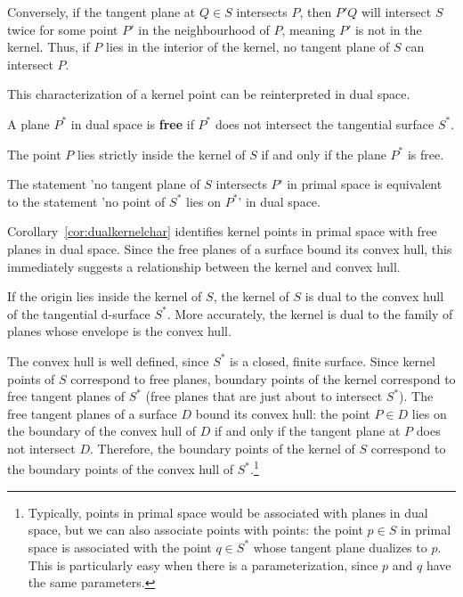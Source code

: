 \documentclass[doublespacing]{elsart}
\begin{document}
Conversely, if the tangent plane at $Q \in S$ intersects $P$, then $P'Q$ will intersect $S$ twice for some point $P'$ in 
the neighbourhood of $P$, meaning $P'$ is not in the kernel.
Thus, if $P$ lies in the interior of the kernel, no tangent plane of $S$ can intersect $P$.
\QED

\noindent This characterization of a kernel point can be reinterpreted in dual space.

\begin{defn2}
A plane $P^*$ in dual space is {\bf free} if $P^*$ does not intersect the tangential surface $S^*$.
\end{defn2}

\begin{corollary}
\label{cor:dualkernelchar}
The point $P$ lies strictly inside the kernel of $S$ if and only if 
the plane $P^*$ is free.
\end{corollary}
\prf
The statement 'no tangent plane of $S$ intersects $P$' in primal space
is equivalent to the statement 'no point of $S^*$ lies on $P^*$' in dual space.
\QED

Corollary~\ref{cor:dualkernelchar} identifies kernel points in primal space
with free planes in dual space.
Since the free planes of a surface bound its convex hull,
this immediately suggests a relationship between the kernel and convex hull.

\begin{theorem}
\label{thm:kernelhull}
If the origin lies inside the kernel of $S$,
the kernel of $S$ is dual to the convex hull of the tangential d-surface $S^*$.
More accurately, the kernel is dual to the family of planes whose
envelope is the convex hull.
\end{theorem}
\prf
The convex hull is well defined, since $S^*$ is a closed, finite surface.
Since kernel points of $S$ correspond to free planes,
boundary points of the kernel correspond to free tangent planes of $S^*$
(free planes that are just about to intersect $S^*$).
The free tangent planes of a surface $D$ bound its convex hull: the point $P \in D$ lies
on the boundary of the convex hull of $D$ if and only if the tangent plane at $P$ 
does not intersect $D$.
Therefore, the boundary points of the kernel of $S$ correspond to the boundary points
of the convex hull of $S^*$.\footnote{Typically, points in primal space would be associated with planes in dual space,
	but we can also associate points with points:
	the point $p \in S$ in primal space is associated
	with the point $q \in S^*$ whose tangent plane dualizes to $p$.
	This is particularly easy when there is a parameterization, since $p$ and $q$ 
	have the same parameters.}
\QED
\end{document}
